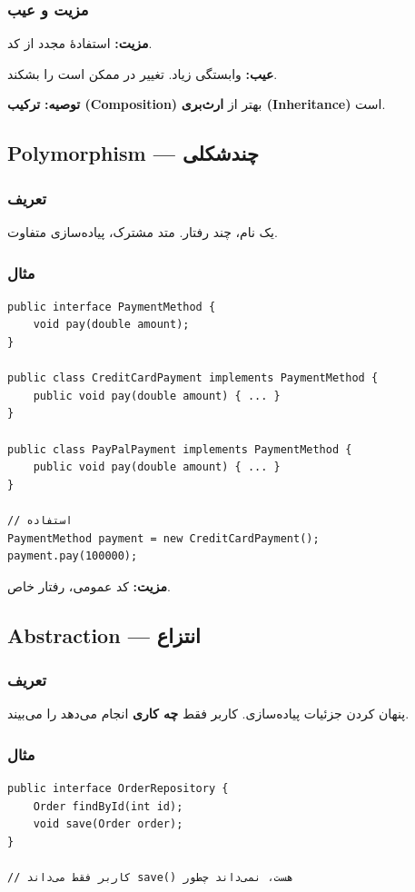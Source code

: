 \documentclass[12pt, a4paper]{article}
\begin{document}
\subsubsection{مزیت و عیب}
\textbf{مزیت:} استفادهٔ مجدد از کد.

\textbf{عیب:} وابستگی زیاد. تغییر در  ممکن است  را 
بشکند.

\textbf{توصیه:} \textbf{ترکیب (Composition)} بهتر از \textbf{ارث‌بری 
(Inheritance)} است.

\subsection{Polymorphism — چندشکلی}

\subsubsection{تعریف}
یک نام، چند رفتار. متد مشترک، پیاده‌سازی متفاوت.

\subsubsection{مثال}
\begin{lstlisting}
public interface PaymentMethod {
    void pay(double amount);
}

public class CreditCardPayment implements PaymentMethod {
    public void pay(double amount) { ... }
}

public class PayPalPayment implements PaymentMethod {
    public void pay(double amount) { ... }
}

// استفاده
PaymentMethod payment = new CreditCardPayment();
payment.pay(100000);
\end{lstlisting}

\textbf{مزیت:} کد عمومی، رفتار خاص.

\subsection{Abstraction — انتزاع}

\subsubsection{تعریف}
پنهان کردن جزئیات پیاده‌سازی. کاربر فقط \textbf{چه کاری} انجام می‌دهد را 
می‌بیند.

\subsubsection{مثال}
\begin{lstlisting}
public interface OrderRepository {
    Order findById(int id);
    void save(Order order);
}

// کاربر فقط می‌داند save() هست، نمی‌داند چطور
\end{lstlisting}
\end{document}
